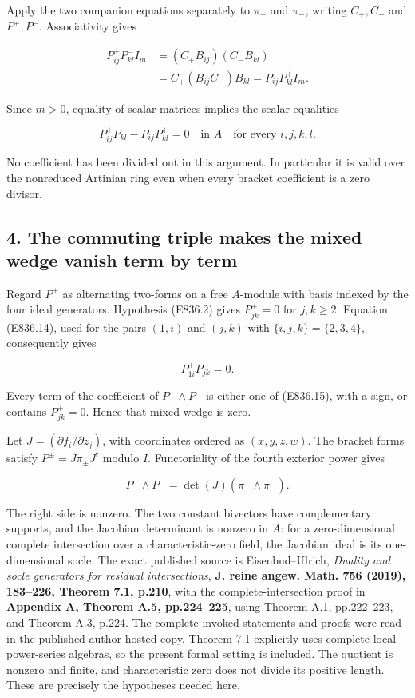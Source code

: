 Apply the two companion equations separately to \(\pi_+\) and \(\pi_-\),
writing \(C_+,C_-\) and \(P^+,P^-\). Associativity gives

\[
 \begin{aligned}
 P^+_{ij}P^-_{kl}I_m
   &=(C_+B_{ij})(C_-B_{kl})\\
   &=C_+(B_{ij}C_-)B_{kl}
     =P^-_{ij}P^+_{kl}I_m.
 \end{aligned}
 \tag{E836.13}
\]

Since \(m>0\), equality of scalar matrices implies the scalar equalities

\[
 P^+_{ij}P^-_{kl}-P^-_{ij}P^+_{kl}=0
          \quad\text{in }A
          \quad\text{for every }i,j,k,l.
 \tag{E836.14}
\]

No coefficient has been divided out in this argument. In particular it
is valid over the nonreduced Artinian ring even when every bracket
coefficient is a zero divisor.

\subsection{4. The commuting triple makes the mixed wedge vanish term by
term}\label{SF-E836:the-commuting-triple-makes-the-mixed-wedge-vanish-term-by-term}

Regard \(P^\pm\) as alternating two-forms on a free \(A\)-module with
basis indexed by the four ideal generators. Hypothesis (E836.2) gives
\(P^+_{jk}=0\) for \(j,k\ge2\). Equation (E836.14), used for the pairs
\((1,i)\) and \((j,k)\) with \(\{i,j,k\}=\{2,3,4\}\), consequently gives

\[
 P^+_{1i}P^-_{jk}=0.
 \tag{E836.15}
\]

Every term of the coefficient of \(P^+\wedge P^-\) is either one of
(E836.15), with a sign, or contains \(P^+_{jk}=0\). Hence that mixed
wedge is zero.

Let \(J=(\partial f_i/\partial z_j)\), with coordinates ordered as
\((x,y,z,w)\). The bracket forms satisfy
\(P^\pm=J\pi_\pm J^{\mathsf t}\) modulo \(I\). Functoriality of the
fourth exterior power gives

\[
 P^+\wedge P^-
    =\det(J)(\pi_+\wedge\pi_-).
 \tag{E836.16}
\]

The right side is nonzero. The two constant bivectors have complementary
supports, and the Jacobian determinant is nonzero in \(A\): for a
zero-dimensional complete intersection over a characteristic-zero field,
the Jacobian ideal is its one-dimensional socle. The exact published
source is Eisenbud--Ulrich, \emph{Duality and socle generators for
residual intersections}, \textbf{J. reine angew. Math. 756 (2019),
183--226, Theorem 7.1, p.210}, with the complete-intersection proof in
\textbf{Appendix A, Theorem A.5, pp.224--225}, using Theorem A.1,
pp.222--223, and Theorem A.3, p.224. The complete invoked statements and
proofs were read in the published author-hosted copy. Theorem 7.1
explicitly uses complete local power-series algebras, so the present
formal setting is included. The quotient is nonzero and finite, and
characteristic zero does not divide its positive length. These are
precisely the hypotheses needed here.

